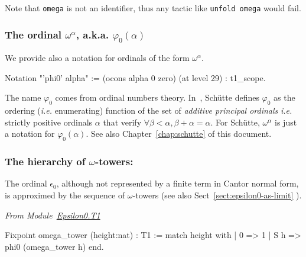 \documentclass[a4paper]{book}
\begin{document}
Note that \texttt{omega} is not an identifier, thus any tactic like \texttt{unfold omega} would fail.


\subsubsection{The ordinal \(\omega^\alpha\), a.k.a. \(\varphi_0(\alpha)\)}
\label{sec:orgheadline70}

We provide also a notation for ordinals of the form $\omega^\alpha$.

\label{sect:notation-phi0}


\begin{Coqsrc}
Notation "'phi0' alpha" := (ocons alpha 0 zero) (at level 29) : t1_scope.
\end{Coqsrc}


\begin{remark}
\label{sec:orgheadline69}
The name \(\varphi_0\)
   comes from ordinal numbers theory. In~\cite{schutte}, Schütte defines 
$\varphi_0$  as the ordering (\emph{i.e.} enumerating) function of the set  of \emph{additive principal ordinals} \emph{i.e.} strictly positive ordinals $\alpha$ that verify $\forall \beta<\alpha, \beta+\alpha=\alpha$. For Schütte,  $\omega^\alpha$ is just a notation for $\varphi_0(\alpha)$.  See also Chapter~\ref{chap:schutte} of this document.
\end{remark}



  
\subsubsection{The hierarchy of \(\omega\)-towers:}
\label{sec:orgheadline71}

The ordinal $\epsilon_0$, although not represented by a finite term in Cantor normal form, is approximed by the sequence of $\omega$-towers (see also Sect~\vref{sect:epsilon0-as-limit} ).

\vspace{4pt}
\emph{From Module~\href{../src/html/hydras.Epsilon0.T1.html}{Epsilon0.T1}}

\begin{Coqsrc}
Fixpoint omega_tower (height:nat) : T1 := 
 match height with 
 | 0 =>  1 
 | S h => phi0 (omega_tower h)
 end.
\end{Coqsrc}
\end{document}
